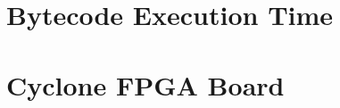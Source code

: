 \chapter{Bytecode Execution Time} \label{appx:bytecode}


%

%


\chapter{Cyclone FPGA Board} \label{appx:cycore}


%




\printindex

%



